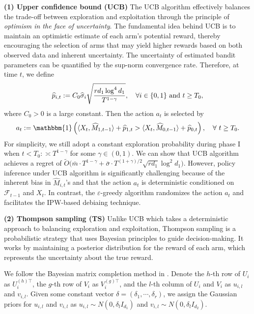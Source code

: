 \documentclass[12pt]{article}
\newcommand{\inp}[2]{\langle #1,#2\rangle}
\def\calF{{\mathcal F}}
\def\RR{{\mathbb R}}
\def\indicator{\mathbf{1}}
\def\hat{\widehat}
\theoremstyle{plain}
\begin{document}

\noindent \textbf{(1) Upper confidence bound (UCB) }
The UCB algorithm effectively balances the trade-off between exploration and exploitation through the principle of \emph{optimism in the face of uncertainty}. The fundamental idea behind UCB is to maintain an optimistic estimate of each arm's potential reward, thereby encouraging the selection of arms that may yield higher rewards based on both observed data and inherent uncertainty. The uncertainty of estimated bandit parameters can be quantified by the sup-norm convergence rate. Therefore, at time $t$, we define
\begin{align*}
     \widehat{p}_{i,t}:= C_0\hat{\sigma}_i\sqrt{\frac{rd_1\log^4d_1}{T^{1-\gamma}}}, \quad \forall i\in\{0,1\}\ {\rm and}\ t\geq T_0,
\end{align*}
where $C_0>0$ is a large constant. Then the action $a_t$ is selected by
\begin{align*}
    a_t:=\mathbbm{1}\left(\inp{X_t}{\widehat{M}_{1,t-1}}+\widehat{p}_{1,t}>\inp{X_t}{\widehat{M}_{0,t-1}}+\widehat{p}_{0,t}\right),\quad \forall \ t\geq T_0.
\end{align*}
For simplicity, we still adopt a constant exploration probability during phase I when $t<T_0:\asymp T^{1-\gamma}$ for some $\gamma\in(0,1)$. We can show that UCB algorithm achieves a regret of $\widetilde{O}\big(\bar{m}\cdot T^{1-\gamma}+\bar\sigma\cdot T^{(1+\gamma)/2}\sqrt{rd_1}\log^2d_1\big)$. However, policy inference under UCB algorithm is significantly challenging because of the inherent bias in $\hat M_{i,t}$'s and that the action $a_t$ is deterministic conditioned on $\calF_{t-1}$ and $X_t$. In contrast, the $\varepsilon$-greedy algorithm randomizes the action $a_t$ and facilitates the IPW-based debiaing technique.  


\noindent \textbf{(2) Thompson sampling (TS) }
Unlike UCB which takes a deterministic approach to balancing exploration and exploitation, Thompson sampling is a probabilistic strategy that uses Bayesian principles to guide decision-making. It works by maintaining a posterior distribution for the reward of each arm, which represents the uncertainty about the true reward. 

We follow the Bayesian matrix completion method in \cite{alquier2014bayesian}. Denote the $h$-th row of $U_i$ as $U_i^{(h)\top}$, the $g$-th row of $V_i$ as $V_i^{(g)\top}$, and the $l$-th column of $U_i$ and $V_i$ as $u_{i,l}$ and $v_{i,l}$. Given some constant vector $\delta=(\delta_1,\cdots, \delta_r)$, we assign the Gaussian priors for $u_{i,l}$ and $v_{i,l}$ as $u_{i,l}\sim N(0, \delta_l I_{d_1})$ and $v_{i,l}\sim N(0, \delta_l I_{d_2})$.
\end{document}
